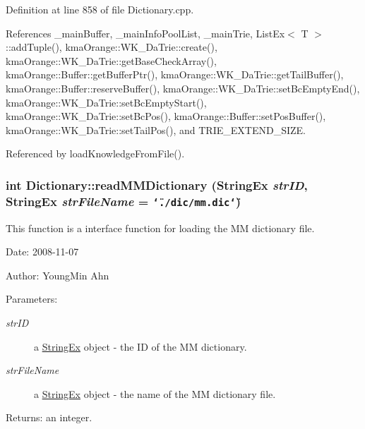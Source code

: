 Definition at line 858 of file Dictionary.cpp.

References \_\-mainBuffer, \_\-mainInfoPoolList, \_\-mainTrie, ListEx$<$ T $>$::addTuple(), kmaOrange::WK\_\-DaTrie::create(), kmaOrange::WK\_\-DaTrie::getBaseCheckArray(), kmaOrange::Buffer::getBufferPtr(), kmaOrange::WK\_\-DaTrie::getTailBuffer(), kmaOrange::Buffer::reserveBuffer(), kmaOrange::WK\_\-DaTrie::setBcEmptyEnd(), kmaOrange::WK\_\-DaTrie::setBcEmptyStart(), kmaOrange::WK\_\-DaTrie::setBcPos(), kmaOrange::Buffer::setPosBuffer(), kmaOrange::WK\_\-DaTrie::setTailPos(), and TRIE\_\-EXTEND\_\-SIZE.

Referenced by loadKnowledgeFromFile().\hypertarget{classkmaOrange_1_1Dictionary_b3dff1eefce8116f926a5ccbf2b05dbd}{
\subsubsection[{readMMDictionary}]{\setlength{\rightskip}{0pt plus 5cm}int Dictionary::readMMDictionary ({\bf StringEx} {\em strID}, \/  {\bf StringEx} {\em strFileName} = {\tt \char`\"{}./dic/mm.dic\char`\"{}})}}
\label{classkmaOrange_1_1Dictionary_b3dff1eefce8116f926a5ccbf2b05dbd}


This function is a interface function for loading the MM dictionary file. 

\begin{Desc}
\item[Date:]2008-11-07 \end{Desc}
\begin{Desc}
\item[Author:]YoungMin Ahn \end{Desc}
\begin{Desc}
\item[Parameters:]
\begin{description}
\item[{\em strID}]a \hyperlink{classStringEx}{StringEx} object - the ID of the MM dictionary. \item[{\em strFileName}]a \hyperlink{classStringEx}{StringEx} object - the name of the MM dictionary file. \end{description}
\end{Desc}
\begin{Desc}
\item[Returns:]an integer. \end{Desc}


